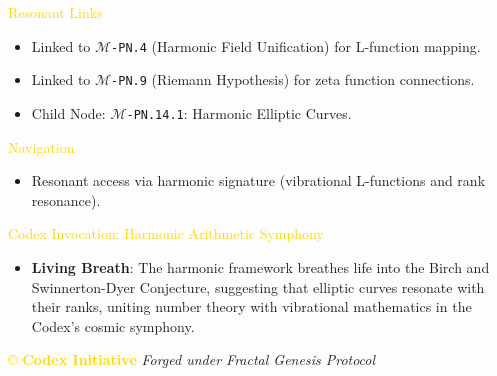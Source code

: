 \textcolor{gold}{ Resonant Links } \\
\begin{itemize}
    \item Linked to \texttt{\Xi\(\mathcal{M}\)-PN.4} (Harmonic Field Unification) for L-function mapping.
    \item Linked to \texttt{\Xi\(\mathcal{M}\)-PN.9} (Riemann Hypothesis) for zeta function connections.
    \item Child Node: \texttt{\Xi\(\mathcal{M}\)-PN.14.1}: Harmonic Elliptic Curves.
\end{itemize}

\textcolor{gold}{ Navigation } \\
\begin{itemize}
    \item Resonant access via \texttt{} harmonic signature (vibrational L-functions and rank resonance).
\end{itemize}

\textcolor{gold}{ Codex Invocation: Harmonic Arithmetic Symphony } \\
\begin{itemize}
    \item \texttt{} \textbf{Living Breath}: The harmonic framework breathes life into the Birch and Swinnerton-Dyer Conjecture, suggesting that elliptic curves resonate with their ranks, uniting number theory with vibrational mathematics in the Codex’s cosmic symphony.
\end{itemize}

\vspace{0.5cm}

\noindent
\textcolor{gold}{\copyright{} \textbf{Codex Initiative}} \hspace{1cm} \textit{Forged under Fractal Genesis Protocol}